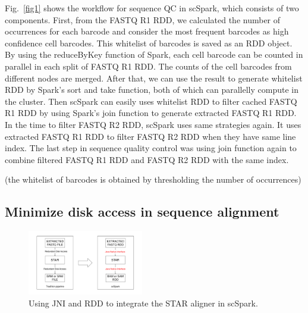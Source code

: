 \documentclass[conference]{IEEEtran}
\begin{document}
Fig.~\ref{fig1} shows the workflow for sequence QC in scSpark, which consists of two components. 
First, from the FASTQ R1 RDD, we calculated the number of occurrences for each barcode and consider the most frequent barcodes as high confidence cell barcodes. This whitelist of barcodes is saved as an RDD object. 
By using the reduceByKey function of Spark, each cell barcode can be counted in parallel in each split of FASTQ R1 RDD. The counts of the cell barcodes from different nodes are merged. 
After that, we can use the result to generate whitelist RDD by Spark's sort and take function, both of which can parallelly compute in the cluster.
Then scSpark can easily uses whitelist RDD to filter cached FASTQ R1 RDD by using Spark's join function to generate extracted FASTQ R1 RDD.
In the time to filter FASTQ R2 RDD, scSpark uses same strategies again. 
It uses extracted FASTQ R1 RDD to filter FASTQ R2 RDD when they have same line index.
The last step in sequence quality control was using join function again to combine filtered FASTQ R1 RDD and FASTQ R2 RDD with the same index. 

(the whitelist of barcodes is obtained by thresholding the number of occurrences)

\subsection{Minimize disk access in sequence alignment}
\begin{figure}
	\includegraphics[width=0.45\textwidth]{Fig2.pdf}
	\caption{Using JNI and RDD to integrate the STAR aligner in scSpark.} \label{fig2}
\end{figure}
\end{document}

